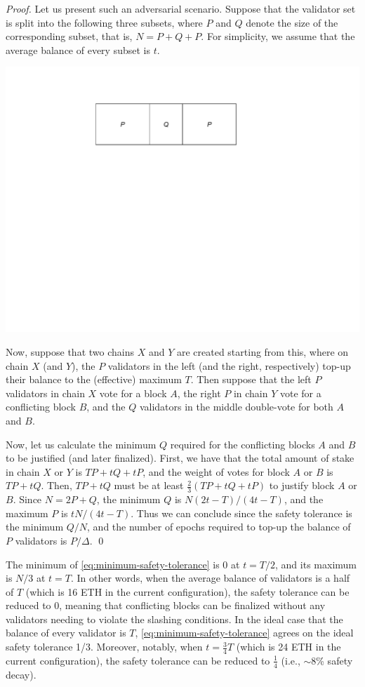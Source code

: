 \begin{proof}
Let us present such an adversarial scenario.
Suppose that the validator set is split into the following three subsets, where $P$ and $Q$ denote the size of the corresponding subset, that is, $N = P + Q + P$.  For simplicity, we assume that the average balance of every subset is $t$.
\begin{center}
\includegraphics[width=.5\columnwidth]{balance-top-ups.pdf}
\end{center}
Now, suppose that two chains $X$ and $Y$ are created starting from this, where on chain $X$ (and $Y$), the $P$ validators in the left (and the right, respectively) top-up their balance to the (effective) maximum $T$.  Then suppose that the left $P$ validators in chain $X$ vote for a block $A$, the right $P$ in chain $Y$ vote for a conflicting block $B$, and the $Q$ validators in the middle double-vote for both $A$ and $B$.

Now, let us calculate the minimum $Q$ required for the conflicting blocks $A$ and $B$ to be justified (and later finalized).  First, we have that the total amount of stake in chain $X$ or $Y$ is $TP + tQ + tP$, and the weight of votes for block $A$ or $B$ is $TP + tQ$.  Then, $TP + tQ$ must be at least $\frac{2}{3} (TP + tQ + tP)$ to justify block $A$ or $B$.  Since $N = 2P+Q$, the minimum $Q$ is $N(2t - T) / (4t - T)$, and the maximum $P$ is $tN / (4t - T)$.
Thus we can conclude since the safety tolerance is the minimum $Q / N$, and
the number of epochs required to top-up the balance of $P$ validators is $P/\Delta$.
\qed
\end{proof}

\begin{remark}
The minimum of \eqref{eq:minimum-safety-tolerance} is 0 at $t = T/2$, and its maximum is $N/3$ at $t = T$.  In other words, when the average balance of validators is a half of $T$ (which is 16 ETH in the current configuration), the safety tolerance can be reduced to 0, meaning that conflicting blocks can be finalized without any validators needing to violate the slashing conditions.  In the ideal case that the balance of every validator is $T$, \eqref{eq:minimum-safety-tolerance} agrees on the ideal safety tolerance 1/3.  Moreover, notably, when $t = \frac{3}{4} T$ (which is 24 ETH in the current configuration), the safety tolerance can be reduced to $\frac{1}{4}$ (i.e., $\sim$8\% safety decay).
\end{remark}

